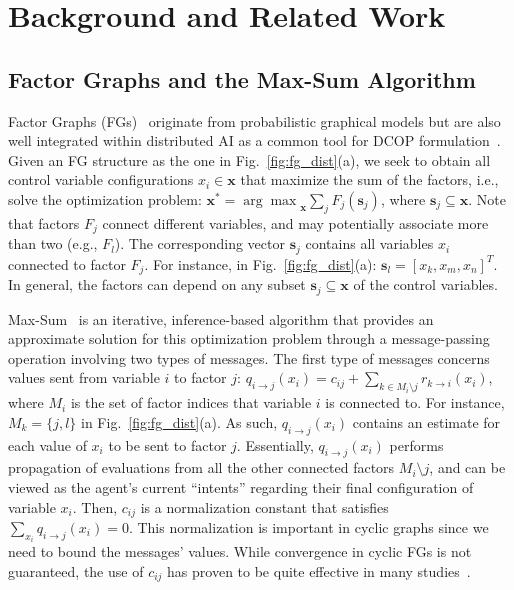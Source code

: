 \section{Background and Related Work}
\label{sec:back_rw}
    

\subsection{Factor Graphs and the Max-Sum Algorithm}
    
Factor Graphs (FGs)~\cite{kschischang2001factor} originate from probabilistic graphical models but are also well integrated within distributed AI as a common tool for DCOP formulation~\cite{maxsumfarinelli,dcopsurvey}.
Given an FG structure as the one in Fig.~\ref{fig:fg_dist}(a), we seek to obtain all control variable configurations $x_i \in \mathbf{x}$ that maximize the sum of the factors, i.e., solve the optimization problem: $\mathbf{x}^*={\arg\max}_{\mathbf{x}}\sum_j F_j(\mathbf{s}_j)$, where $\mathbf{s}_j \subseteq \mathbf{x}$.
Note that factors $F_j$ connect different variables, and may potentially associate more than two (e.g., $F_l$).
The corresponding vector $\mathbf{s}_j$ contains all variables $x_i$ connected to factor $F_j$.
For instance, in Fig.~\ref{fig:fg_dist}(a): $\mathbf{s}_l=[x_k,x_m,x_n]^T$.
In general, the factors can depend on any subset $\mathbf{s}_j \subseteq \mathbf{x}$ of the control variables.


Max-Sum~\cite{maxsumfarinelli} is an iterative, inference-based algorithm that provides an approximate solution for this optimization problem through
a message-passing operation involving two types of messages.
The first type of messages concerns values sent from variable $i$ to factor $j$:
$q_{i \rightarrow j}(x_i) = c_{ij} + \sum_{k \in M_i \setminus j} r_{k \rightarrow i}(x_i)$, where $M_i$ is the set of factor indices that variable $i$ is connected to. 
For instance, $M_k=\{j,l\}$ in Fig.~\ref{fig:fg_dist}(a). 
As such, $q_{i \rightarrow j}(x_i)$ contains an estimate for each value of $x_i$ to be sent to factor $j$.
Essentially, $q_{i \rightarrow j}(x_i)$ performs propagation of evaluations from all the other connected factors $M_i \setminus j$,
and can be viewed as the agent's current ``intents'' regarding their final configuration of variable $x_i$.
Then, $c_{ij}$ is a normalization constant that satisfies $\sum_{x_i}q_{i \rightarrow j}(x_i)=0$.
This normalization is important in cyclic graphs since we need to bound the messages' values. 
While convergence in cyclic FGs is not guaranteed, the use of $c_{ij}$ has proven to be quite effective in many studies~\cite{kok_vlassis,loopy_belief_prop,maxsumfarinelli}.

